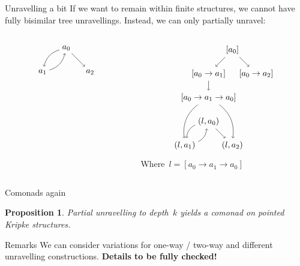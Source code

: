 \documentclass{beamer}
\newtheorem{proposition}{Proposition}
\begin{document}
\begin{frame}{Unravelling a bit}
If we want to remain within finite structures, we cannot have fully bisimilar tree unravellings. Instead, we can only partially unravel:
\begin{columns}
\begin{column}{0.5\textwidth}
\begin{equation*}
        \begin{tikzpicture}
        \path node(a0) {$a_0$} +(-1,-1) node (a1) {$a_1$} +(1,-1) node(a2) {$a_2$};
        \path[->] 
        (a0) edge[bend right] (a1)
        (a1) edge[bend right] (a0)
        (a0) edge (a2);
        \end{tikzpicture}
    \end{equation*}
\end{column}
\begin{column}{0.5\textwidth}
\begin{equation*}
        \begin{tikzpicture}
        \path 
        node (a) {$[a_0]$} +(-1,-1) 
        node (b) {$[a_0 \rightarrow a_1]$} ++(1,-1)
        node (c) {$[a_0 \rightarrow a_2]$} (b) ++(0,-1)
        node (a') {$[a_0 \rightarrow a_1 \rightarrow a_0]$} ++(0,-1)
        node (a'') {$(l, a_0)$} +(-1,-1)
        node (b'') {$(l, a_1)$} +(1,-1)
        node (c'') {$(l, a_2)$};
        \path[->]
        (a) edge (b)
        (a) edge (c)
        (b) edge (a')
        (a') edge[bend right] (b'')
        (a') edge[bend left] (c'')
        (a'') edge[bend right] (b'')
        (b'') edge[bend right] (a'')
        (a'') edge (c'');
        \end{tikzpicture}
    \end{equation*}
    Where~$l = [a_0 \rightarrow a_1 \rightarrow a_0]$
\end{column}
\end{columns}    
    
\end{frame}

\begin{frame}{Comonads again}
    \begin{proposition}
    Partial unravelling to depth~$k$ yields a comonad on pointed Kripke structures.
    \end{proposition}
    \begin{block}{Remarks}
    We can consider variations for one-way / two-way and different unravelling constructions. {\bf Details to be fully checked!}
    \end{block}
\end{frame}
\end{document}
